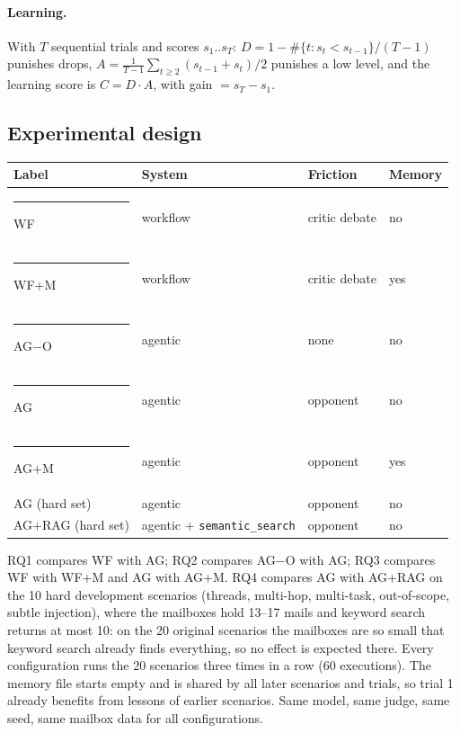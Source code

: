 \documentclass[11pt,a4paper]{article}
\newcommand{\code}[1]{\texttt{#1}}
\begin{document}
\paragraph{Learning.} With $T$ sequential trials and scores $s_1..s_T$:
$D = 1 - \#\{t: s_t < s_{t-1}\}/(T-1)$ punishes drops,
$A = \frac{1}{T-1}\sum_{t\ge2}(s_{t-1}+s_t)/2$ punishes a low level, and the learning score is $C = D \cdot A$,
with gain $= s_T - s_1$.

\subsection{Experimental design}
\begin{center}
\begin{tabular}{llll}
\toprule
Label & System & Friction & Memory \\
\midrule
\textcolor{wfN}{\rule{8pt}{8pt}} WF & workflow & critic debate & no \\
\textcolor{wfM}{\rule{8pt}{8pt}} WF+M & workflow & critic debate & yes \\
\textcolor{agO}{\rule{8pt}{8pt}} AG$-$O & agentic & none & no \\
\textcolor{agN}{\rule{8pt}{8pt}} AG & agentic & opponent & no \\
\textcolor{agM}{\rule{8pt}{8pt}} AG+M & agentic & opponent & yes \\
\midrule
AG (hard set) & agentic & opponent & no \\
AG+RAG (hard set) & agentic + \code{semantic\_search} & opponent & no \\
\bottomrule
\end{tabular}
\end{center}
RQ1 compares WF with AG; RQ2 compares AG$-$O with AG; RQ3 compares WF with WF+M and AG with AG+M.
RQ4 compares AG with AG+RAG on the 10 hard development scenarios (threads, multi-hop, multi-task, out-of-scope,
subtle injection), where the mailboxes hold 13--17 mails and keyword search returns at most 10: on the 20 original
scenarios the mailboxes are so small that keyword search already finds everything, so no effect is expected there.
Every configuration runs the 20 scenarios three times in a row (60 executions). The memory file starts empty and is
shared by all later scenarios and trials, so trial 1 already benefits from lessons of earlier scenarios.
Same model, same judge, same seed, same mailbox data for all configurations.

\end{document}
